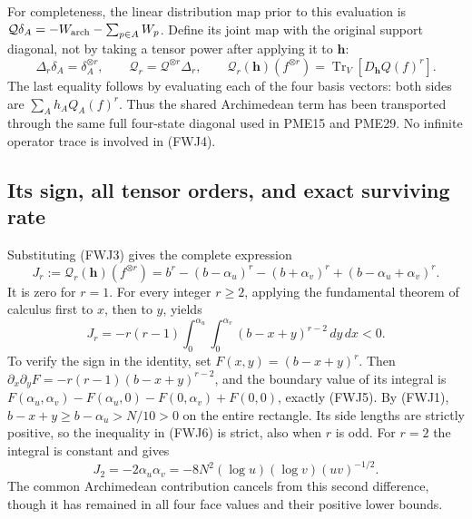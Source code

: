 \documentclass[11pt]{article}
\begin{document}
For completeness, the linear distribution map prior to this
evaluation is $\mathcal Q\delta_A=-W_{\rm arch}-\sum_{p\in A}W_p$.
Define its joint map with the original support diagonal, not by
taking a tensor power after applying it to $\mathbf h$:
\begin{equation}\tag{FWJ4}
 \Delta_r\delta_A=\delta_A^{\otimes r},\qquad
 \mathcal Q_r=\mathcal Q^{\otimes r}\Delta_r,\qquad
 \mathcal Q_r(\mathbf h)(f^{\otimes r})
       =\operatorname{Tr}_V[D_{\mathbf h}Q(f)^r].
\end{equation}
The last equality follows by evaluating each of the four basis
vectors: both sides are $\sum_A h_AQ_A(f)^r$.
Thus the shared Archimedean term has been transported through the
same full four-state diagonal used in PME15 and PME29. No infinite
operator trace is involved in (FWJ4).

\subsection{Its sign, all tensor orders, and exact surviving rate}

Substituting (FWJ3) gives the complete expression
\begin{equation}\tag{FWJ5}
 J_r:=\mathcal Q_r(\mathbf h)(f^{\otimes r})
 =b^r-(b-\alpha_u)^r-(b+\alpha_v)^r
                         +(b-\alpha_u+\alpha_v)^r .
\end{equation}
It is zero for $r=1$. For every integer $r\ge2$, applying the
fundamental theorem of calculus first to $x$, then to $y$, yields
\begin{equation}\tag{FWJ6}
 J_r=-r(r-1)\int_0^{\alpha_u}\int_0^{\alpha_v}
                         (b-x+y)^{r-2}\,dy\,dx<0 .
\end{equation}
To verify the sign in the identity, set $F(x,y)=(b-x+y)^r$.
Then $\partial_x\partial_yF=-r(r-1)(b-x+y)^{r-2}$, and the
boundary value of its integral is
$F(\alpha_u,\alpha_v)-F(\alpha_u,0)-F(0,\alpha_v)+F(0,0)$,
exactly (FWJ5). By (FWJ1), $b-x+y\ge b-\alpha_u>N/10>0$
on the entire rectangle. Its side lengths are strictly positive,
so the inequality in (FWJ6) is strict, also when $r$ is odd.
For $r=2$ the integral is constant and gives
\begin{equation}\tag{FWJ7}
 J_2=-2\alpha_u\alpha_v
     =-8N^2(\log u)(\log v)(uv)^{-1/2}.
\end{equation}
The common Archimedean contribution cancels from this second
difference, though it has remained in all four face values and
their positive lower bounds.
\end{document}
